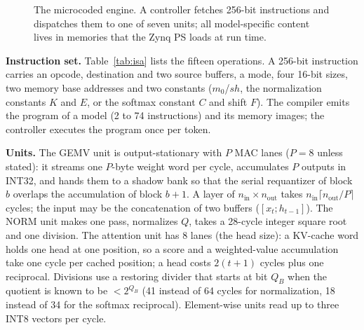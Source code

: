 \begin{figure}[t]
\centering
\resizebox{\columnwidth}{!}{}
\caption{The microcoded engine. A controller fetches 256-bit instructions and dispatches them to one of seven units;
all model-specific content lives in memories that the Zynq PS loads at run time.}
\label{fig:engine}
\end{figure}

\textbf{Instruction set.} Table~\ref{tab:isa} lists the fifteen operations. A 256-bit instruction carries an opcode,
destination and two source buffers, a mode, four 16-bit sizes, two memory base addresses and two constants
($m_0$/$sh$, the normalization constants $K$ and $E$, or the softmax constant $C$ and shift $F$). The compiler emits the
program of a model (2 to 74 instructions) and its memory images; the controller executes the program once per token.

\begin{table}[t]
\centering\footnotesize
\caption{Engine operations.}
\label{tab:isa}
\setlength{\tabcolsep}{3pt}
\end{table}

\textbf{Units.} The GEMV unit is output-stationary with $P$ MAC lanes ($P=8$ unless stated): it streams one
$P$-byte weight word per cycle, accumulates $P$ outputs in INT32, and hands them to a shadow bank so that the serial
requantizer of block $b$ overlaps the accumulation of block $b+1$. A layer of $n_\mathrm{in}\times n_\mathrm{out}$ takes
$n_\mathrm{in}\lceil n_\mathrm{out}/P\rceil$ cycles; the input may be the concatenation of two buffers ($[x_t;h_{t-1}]$).
The NORM unit makes one pass, normalizes $Q$, takes a 28-cycle integer square root and one division. The attention unit has
8 lanes (the head size): a KV-cache word holds one head at one position, so a score and a weighted-value accumulation take
one cycle per cached position; a head costs $2(t+1)$ cycles plus one reciprocal. Divisions use a restoring divider that
starts at bit $Q_B$ when the quotient is known to be $<2^{Q_B}$ (41 instead of 64 cycles for normalization, 18 instead
of 34 for the softmax reciprocal). Element-wise units read up to three INT8 vectors per cycle.

